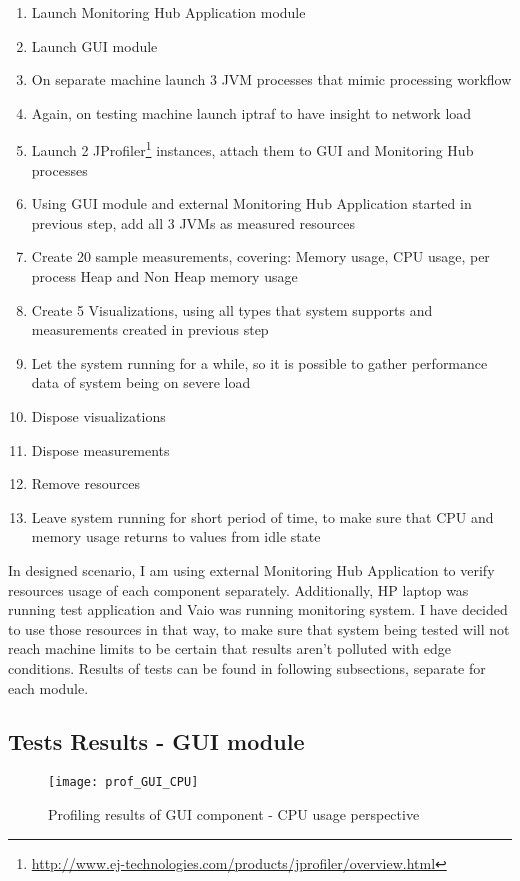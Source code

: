 \begin{enumerate}
\item Launch Monitoring Hub Application module
\item Launch GUI module
\item On separate machine launch 3 JVM processes that mimic processing workflow
\item Again, on testing machine launch iptraf to have insight to network load
\item Launch 2 JProfiler\footnote{\url{http://www.ej-technologies.com/products/jprofiler/overview.html}} instances, attach them to GUI and Monitoring Hub processes
\item Using GUI module and external Monitoring Hub Application started in previous step, add all 3 JVMs as measured resources
\item Create 20 sample measurements, covering: Memory usage, CPU usage, per process Heap and Non Heap memory usage
\item Create 5 Visualizations, using all types that system supports and measurements created in previous step
\item Let the system running for a while, so it is possible to gather performance data of system being on severe load
\item Dispose visualizations
\item Dispose measurements
\item Remove resources
\item Leave system running for short period of time, to make sure that CPU and memory usage returns to values from idle state
\end{enumerate}

In designed scenario, I am using external Monitoring Hub Application to verify resources usage of each component separately. Additionally, HP laptop was running test application and Vaio was running monitoring system. I have decided to use those resources in that way, to make sure that system being tested will not reach machine limits to be certain that results aren\rq{}t polluted with edge conditions. Results of tests  can be found in following subsections, separate for each module.

\subsection{Tests Results - GUI module}


\begin{figure}[ht]
  \centering
  \texttt{[image: prof\_GUI\_CPU]}
  \caption{Profiling results of GUI component - CPU usage perspective}
  \label{fig:prof_GUI_CPU}
\end{figure}


